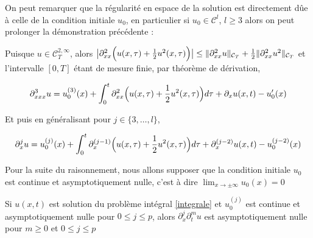 \begin{remarkbox}
\begin{remark}
    On peut remarquer que la régularité en espace de la solution est directement dûe à celle 
    de la condition initiale $u_0$, en particulier si $u_0 \in \mathcal{C}^l$, $l \geq 3$ alors on peut prolonger la démonstration précédente : 

    Puisque $u \in \mathcal{C}_T^{2,\infty}$, alors $\big| \partial_{xx} ^2 \Bigl(u(x,\tau) + \frac{1}{2}u^2(x,\tau)\Bigr) \big| \leq \|\partial_{xx}^2 u\|_{\mathcal{C}_T} + \frac{1}{2}\|\partial_{xx}^2 u^2\|_{\mathcal{C}_T}$ et l'intervalle
    $[0,T]$ étant de mesure finie, par théorème de dérivation,

    $$ \partial_{xxx}^3 u = u_0^{(3)}(x) + \int_{0}^{t} \partial_{xx}^2 \Bigl( u(x,\tau) + \frac{1}{2} u^2(x,\tau) \Bigr) d\tau + \partial_x u(x,t) - u_0'(x) $$

    Et puis en généralisant pour $j \in \{3, \dots , l\}$,

    $$ \partial_{x}^j u = u_0^{(j)}(x) + \int_{0}^{t} \partial_{x}^{(j-1)} \Bigl( u(x,\tau) + \frac{1}{2} u^2(x,\tau) \Bigr) d\tau + \partial_x^{(j-2)} u(x,t) - u_0^{(j-2)}(x) $$

\end{remark}
\end{remarkbox}

\vspace{1em}

Pour la suite du raisonnement, nous allons supposer que la condition initiale $u_0$ est continue et asymptotiquement nulle, 
c'est à dire $\lim_{x \rightarrow \pm \infty} u_0(x) = 0$

\begin{lemmabox}
\begin{lemma} \label{lemme 3}
    Si $u(x,t)$ est solution du problème intégral \ref{integrale} et $u_0^{(j)}$ est continue et asymptotiquement nulle pour $0 \leq j\leq p$, 
    alors $\partial_x^{j}\partial_t^m u$ est asymptotiquement nulle pour $m \geq 0$ et $0 \leq j\leq p$
\end{lemma}
\end{lemmabox}

